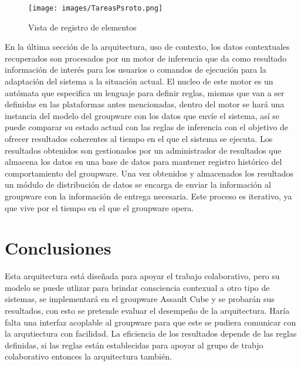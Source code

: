 \begin{figure}[h!]
\texttt{[image: images/TareasPsroto.png]}
\caption{Vista de registro de elementos}
\label{Ptf:registro}
\end{figure}

En la \'ultima secci\'on de la arquitectura, uso de contexto, los datos contextuales recuperados son procesados por un motor de inferencia que da como resultado informaci\'on de inter\'es para los usuarios o comandos de ejecuci\'on para la adaptaci\'on del sistema a la situaci\'on actual. El nucleo de este motor es un aut\'omata que especifica un lenguaje para definir reglas, mismas que van a ser definidas en las plataformas antes mencionadas, dentro del motor se har\'a una instancia del modelo del groupware con los datos que env\'ie el sistema, as\'i se puede comparar su estado actual con las reglas de inferencia con el objetivo de ofrecer resultados coherentes al tiempo en el que el sistema se ejecuta. Los resultados obtenidos son gestionados por un administrador de resultados que almacena los datos en una base de datos para mantener registro hist\'orico del comportamiento del groupware. Una vez obtenidos y almacenados los resultados un m\'odulo de distribuci\'on de datos se encarga de enviar la informaci\'on al groupware con la informaci\'on de entrega necesaria. Este proceso es iterativo, ya que vive por el tiempo en el que el groupware opera.

\section{Conclusiones}
Esta arquitectura está diseñada para apoyar el trabajo colaborativo, pero su modelo se puede utlizar para brindar consciencia contexual a otro tipo de sistemas, se implementar\'a en el groupware Assault Cube y se probar\'an sus resultados, con esto se pretende evaluar el desempe\~no de la arquitectura. Har\'ia falta una interfaz acoplable al groupware para que este se pudiera comunicar con la arqutiectura con facilidad. La eficiencia de los resultados depende de las reglas definidas, si las reglas est\'an establecidas para apoyar al grupo de trabjo colaborativo entonces la arquitectura tambi\'en.
 